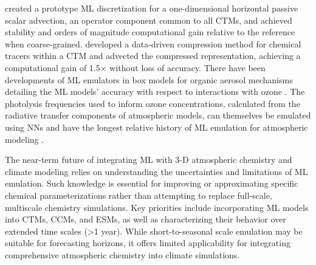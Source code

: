 \documentclass[gmd, manuscript]{copernicus}
\begin{document}
\citet{park_learned_2023} created a prototype ML discretization for a one-dimensional horizontal passive scalar advection, an operator component common to all CTMs, and achieved stability and orders of magnitude computational gain relative to the reference when coarse-grained. \citet{sturm_advecting_2023} developed a data-driven compression method for chemical tracers within a CTM and advected the compressed representation, achieving a computational gain of 1.5$\times$ without loss of accuracy. There have been developments of ML emulators in box models for organic aerosol mechanisms detailing the ML models’ accuracy with respect to interactions with ozone \citep{mouchel-vallon_toward_2023, schreck_neural_2022}. The photolysis frequencies used to inform ozone concentrations, calculated from the radiative transfer components of atmospheric models, can themselves be emulated using NNs \citep{lagerquist_using_2021} and have the longest relative history of ML emulation for atmospheric modeling \citep{krasnopolsky_new_2005,krasnopolsky_decadal_2008}. 


 The near-term future of integrating ML with 3-D atmospheric chemistry and climate modeling relies on understanding the uncertainties and limitations of ML emulation. Such knowledge is essential for improving or approximating specific chemical parameterizations rather than attempting to replace full-scale, multiscale chemistry simulations. Key priorities include incorporating ML models into CTMs, CCMs, and ESMs, as well as characterizing their behavior over extended time scales (>1 year). While short-to-seasonal scale emulation may be suitable for forecasting horizons, it offers limited applicability for integrating comprehensive atmospheric chemistry into climate simulations. %

\end{document}
